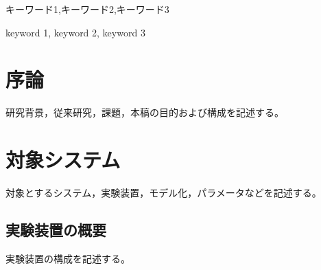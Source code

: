 \documentclass[dvipdfmx,usejistfm]{ieej-tec2}
\begin{document}
\begin{jkeyword}
キーワード1,キーワード2,キーワード3
\end{jkeyword}

\begin{ekeyword}
keyword 1, keyword 2, keyword 3
\end{ekeyword}

\begin{abstract}
\ \ 英文アブストラクトを記述する。
\end{abstract}

\maketitle

\section{序論}
研究背景，従来研究，課題，本稿の目的および構成を記述する。


\section{対象システム}
対象とするシステム，実験装置，モデル化，パラメータなどを記述する。

\subsection{実験装置の概要}
実験装置の構成を記述する。

%
\end{document}
